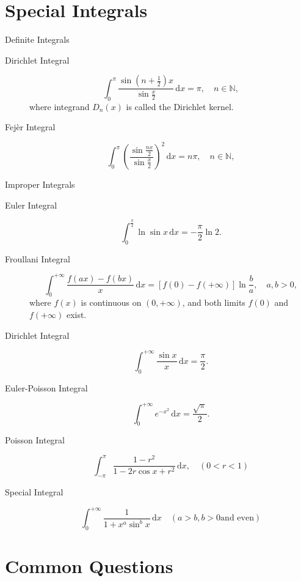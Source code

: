 \documentclass[11pt]{../../TexTemplate/elegantbook}
\begin{document}
\section{Special Integrals}
\begin{leftbarTitle}{Definite Integrals}\end{leftbarTitle}
\begin{description}
    \item[Dirichlet Integral] 
        \[
        \int_{0}^{\pi} \frac{\sin \left( n+\frac{1}{2} \right)x }{\sin \frac{x}{2}} \, \mathrm{d}x = \pi,\quad n \in \mathbb{N},
        \]
        where integrand \(D_{n}(x)\) is called the Dirichlet kernel. 
    \item[Fejèr Integral]
        \[
        \int_{0}^{\pi} \left( \frac{\sin \frac{n x}{2}}{\sin \frac{x}{2}} \right)^2 \, \mathrm{d}x = n\pi, \quad n \in \mathbb{N},
        \] 
\end{description}
\begin{leftbarTitle}{Improper Integrals}\end{leftbarTitle}
\begin{description}
    \item[Euler Integral]
        \[
        \int_{0}^{\frac{\pi}{2}} \ln \sin x \, \mathrm{d}x= - \frac{\pi}{2} \ln 2.
        \]
    \item[Froullani Integral]
        \[
        \int_{0}^{+\infty} \frac{f(ax) - f(bx)}{x} \, \mathrm{d}x = [f(0) - f(+\infty)] \ln \frac{b}{a}, \quad a, b > 0,
        \]
        where \( f(x) \) is continuous on \( (0, +\infty) \), and both limits \( f(0) \) and \( f(+\infty) \) exist.
    \item[Dirichlet Integral]
        \[
        \int_{0}^{+\infty} \frac{\sin x}{x} \, \mathrm{d}x = \frac{\pi}{2}.
        \]
    \item[Euler-Poisson Integral]
        \[
        \int_{0}^{+\infty} e^{-x^2} \, \mathrm{d}x = \frac{\sqrt{\pi}}{2}.
        \]
    \item[Poisson Integral]
        \[
        \int_{-\pi}^{\pi} \frac{1-r^2}{1-2r\cos x+r^2} \, \mathrm{d}x,\quad(0<r<1)
        \]
    \item [Special Integral]
    \[
    \int_{0}^{+ \infty} \frac{1}{1+x^a\sin^bx} \, \mathrm{d}x \quad (a > b, b > 0 \text{and even})
    \]
\end{description}


\section{Common Questions}
\end{document}
